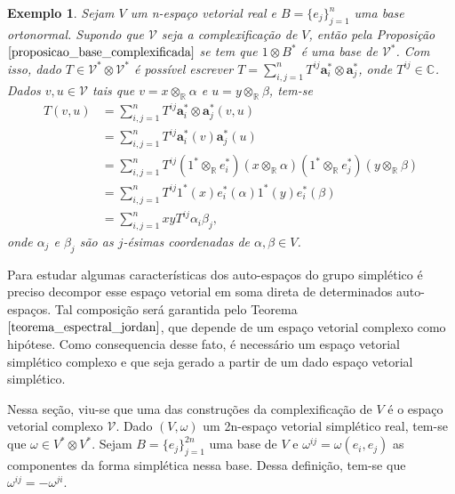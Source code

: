 \documentclass[12pt]{book}
\newtheorem{exemplo}[teorema]{Exemplo}
\newcommand{\colecaofinita}[2]{\{#1_{j} \}_{j=1}^{#2}}
\newcommand{\complexificado}[1]{\mathcal{#1}}
\newcommand{\complexificacaoelemento}[2]{#1\otimes_{\reta} #2}
\newcommand{\complexo}[1]{\mathbb{C}^{#1}}
\newcommand{\produtotensorialabrev}[2]{#1\otimes #2}
\newcommand{\produtotensorialdual}{\produtotensorialabrev{\complexificado{V}^{*}}{\complexificado{V}^{*}}}
\newcommand{\real}[1]{\mathbb{R}^{#1}}
\newcommand{\reta}{\real{}}
\begin{document}
	\begin{exemplo}\label{exemplo_complexificacao_tensorial}
		Sejam $V$ um n-espaço vetorial real e $B = \colecaofinita{e}{n}$ uma base ortonormal. Supondo que $\complexificado{V}$ seja a complexificação de $V$, então pela Proposição $\ref{proposicao_base_complexificada}$ se tem que $1\otimes B^{*}$ é uma base de $\complexificado{V}^{*}$. Com isso, dado $T \in \produtotensorialdual$ é possível escrever $T = \sum_{i,j = 1}^{n} T^{ij}\textbf{a}^{*}_{i}\otimes \textbf{a}^{*}_{j}$, onde $T^{ij} \in \complexo{}$. Dados $v, u\in \complexificado{V}$ tais que $v=\complexificacaoelemento{x}{\alpha}$ e $u=\complexificacaoelemento{y}{\beta}$, tem-se
		$$
		\begin{aligned}
		T(v,u) &= \sum_{i,j = 1}^{n}
		T^{ij}\textbf{a}^{*}_{i}\otimes \textbf{a}^{*}_{j}(v,u)
		\\
		&= \sum_{i,j = 1}^{n}
		T^{ij}\textbf{a}^{*}_{i}(v)\textbf{a}^{*}_{j}(u)
		\\
		&= \sum_{i,j = 1}^{n}
		T^{ij}(\complexificacaoelemento{1^{*}}{e^{*}_{i}})(\complexificacaoelemento{x}{\alpha})(\complexificacaoelemento{1^{*}}{e^{*}_{j}})(\complexificacaoelemento{y}{\beta})
		\\
		&= \sum_{i,j = 1}^{n}
		T^{ij}1^{*}(x)e^{*}_{i}(\alpha)1^{*}(y)e^{*}_{i}(\beta)
		\\
		&= \sum_{i,j = 1}^{n}
		xyT^{ij}\alpha_{i}\beta_{j},
		\end{aligned}
		$$ 
		onde $\alpha_{j}$ e $\beta_{j}$ são as $j$-ésimas coordenadas de $\alpha, \beta \in V$. 
	\end{exemplo}
	
	Para estudar algumas características dos auto-espaços do grupo simplético é preciso  decompor esse espaço vetorial em soma direta de determinados  auto-espaços. Tal composição será garantida pelo Teorema $\ref{teorema_espectral_jordan}$, que depende de um espaço vetorial complexo como hipótese. Como consequencia desse fato, é necessário um espaço vetorial simplético complexo e que seja gerado a partir de um dado espaço vetorial simplético.
	
	Nessa seção, viu-se que uma das construções da complexificação de $V$ é o espaço vetorial complexo $\complexificado{V}$. Dado $(V, \omega)$ um 2n-espaço vetorial simplético real, tem-se que $\omega \in V^{*}\otimes V^{*}$. Sejam $B = \{e_{j}\}_{j=1}^{2n}$ uma base de $V$ e $\omega^{ij} = \omega(e_{i}, e_{j})$ as componentes da forma simplética nessa base. Dessa definição, tem-se que $\omega^{ij} = -\omega^{ji}$.
	
\end{document}
